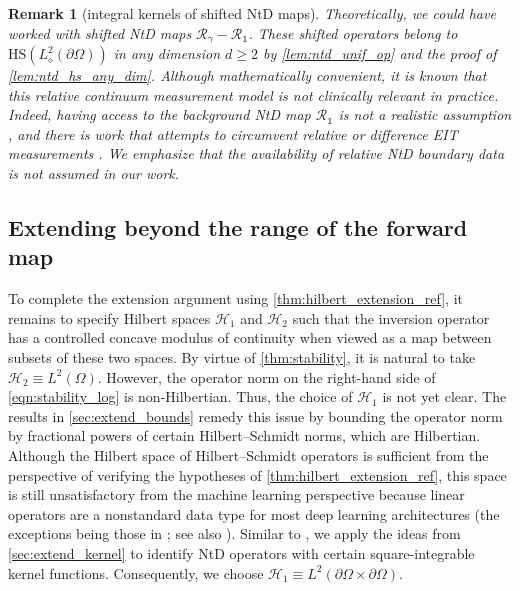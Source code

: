 \documentclass[pdflatex,sn-mathphys-num]{sn-jnl-preprint}
\newcommand{\cH}{\mathcal{H}}
\newcommand{\sR}{\mathscr{R}}
\newcommand{\pOmega}{{\partial\Omega}}
\newcommand{\ntd}{\mathscr{R}_{\gamma}}
\newcommand{\HS}{\mathrm{HS}} %
\newcommand{\onebm}{\mathds{1}} %
\theoremstyle{thmstyleone}%
\theoremstyle{thmstyletwo}%
\newtheorem{remark}{Remark}%
\theoremstyle{thmstylethree}%
\numberwithin{equation}{section}
\numberwithin{theorem}{section}
\begin{document}
\begin{remark}[integral kernels of shifted NtD maps]
    Theoretically, we could have worked with shifted NtD maps $\ntd-\sR_{\onebm}$. These shifted operators belong to $\HS(L^2_\diamond(\pOmega))$ in any dimension $d\geq 2$ by \cref{lem:ntd_unif_op} and the proof of \cref{lem:ntd_hs_any_dim}. Although mathematically convenient, it is known that this relative continuum measurement model is not clinically relevant in practice. Indeed, having access to the background NtD map $\sR_{\onebm}$ is not a realistic assumption \cite[Chp.~12.8.5, p.~182]{mueller2012linear}, and there is work that attempts to circumvent relative or difference EIT measurements \cite{garde2021mimicking}. We emphasize that the availability of relative NtD boundary data \emph{is not assumed} in our work.
\end{remark}


\subsection{Extending beyond the range of the forward map}\label{sec:extend_main}
To complete the extension argument using \cref{thm:hilbert_extension_ref}, it remains to specify Hilbert spaces $\cH_1$ and $\cH_2$ such that the inversion operator has a controlled concave modulus of continuity when viewed as a map between subsets of these two spaces. By virtue of \cref{thm:stability}, it is natural to take $\cH_2\equiv L^2(\Omega)$. However, the operator norm on the right-hand side of \eqref{eqn:stability_log} is non-Hilbertian. Thus, the choice of $\cH_1$ is not yet clear. The results in \cref{sec:extend_bounds} remedy this issue by bounding the operator norm by fractional powers of certain Hilbert--Schmidt norms, which are Hilbertian. Although the Hilbert space of Hilbert--Schmidt operators is sufficient from the perspective of verifying the hypotheses of \cref{thm:hilbert_extension_ref}, this space is still unsatisfactory from the machine learning perspective because linear operators are a nonstandard data type for most deep learning architectures (the exceptions being those in \cite{castro2024calderon,de2019deep,abhishek2024solving}; see also \cite[Sec.~4.2--4.3]{nelsen2025operator}). Similar to \cite{fan2020solving}, we apply the ideas from \cref{sec:extend_kernel} to identify NtD operators with certain square-integrable kernel functions. Consequently, we choose $\cH_1\equiv L^2(\pOmega\times\pOmega)$.
\end{document}
